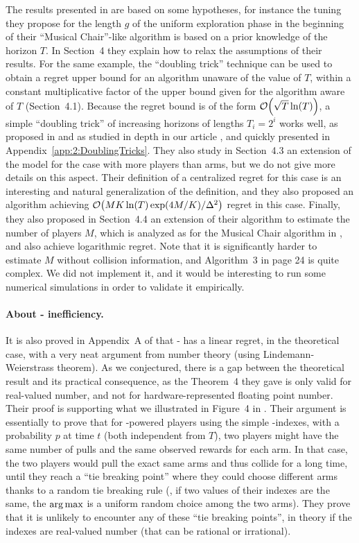 The results presented in \cite{LugosiMehrabian18} are based on some hypotheses, for instance the tuning they propose for the length $g$ of the uniform exploration phase in the beginning of their ``Musical Chair''-like algorithm is based on a prior knowledge of the horizon $T$.
In Section~4 they explain how to relax the assumptions of their results.
For the same example, the ``doubling trick'' technique can be used to obtain a regret upper bound for an algorithm unaware of the value of $T$, within a constant multiplicative factor of the upper bound given for the algorithm aware of $T$ (Section~4.1). Because the regret bound is of the form $\mathop{}\mathopen{}\mathcal{O}\mathopen{}\left(\sqrt{T} \ln(T)\right)$, a simple ``doubling trick'' of increasing horizons of lengths $T_i = 2^i$ works well, as proposed in \cite{CesaLugosi06} and as studied in depth in our article \cite{Besson2018DoublingTricks}, and quickly presented in Appendix~\ref{app:2:DoublingTricks}.
%
They also study in Section~4.3 an extension of the model for the case with more players than arms, but we do not give more details on this aspect. Their definition of a centralized regret for this case is an interesting and natural generalization of the definition, and they also proposed an algorithm achieving $\mathop{}\mathopen{}\mathcal{O}\mathopen{}\left(M K \ln(T) \exp(4M/K) / \Delta^2\right)$ regret in this case.
Finally, they also proposed in Section~4.4 an extension of their algorithm to estimate the number of players $M$, which is analyzed as for the Musical Chair algorithm in \cite{Rosenski16}, and also achieve logarithmic regret.
Note that it is significantly harder to estimate $M$ without collision information, and Algorithm~3 in page 24 is quite complex.
We did not implement it, and it would be interesting to run some numerical simulations in order to validate it empirically.


\paragraph{About \Selfish-\UCB{} inefficiency.}
%
It is also proved in Appendix~A of \cite{BoursierPerchet18} that \Selfish-\UCB{} has a linear regret, in the theoretical case, with a very neat argument from number theory (using Lindemann-Weierstrass theorem). As we conjectured, there is a gap between the theoretical result and its practical consequence, as the Theorem~4 they gave is only valid for real-valued number, and not for hardware-represented floating point number.
Their proof is supporting what we illustrated in Figure~4 in \cite{Besson2018ALT}.
Their argument is essentially to prove that for \Selfish-powered players using the simple \UCB-indexes, with a probability $p$ at time $t$ (both independent from $T$), two players might have the same number of pulls and the same observed rewards for each arm. In that case, the two players would pull the exact same arms and thus collide for a long time, until they reach a ``tie breaking point'' where they could choose different arms thanks to a random tie breaking rule (\eg, if two values of their \UCB{} indexes are the same, the $\operatorname*{arg\,max}$ is a uniform random choice among the two arms).
They prove that it is unlikely to encounter any of these ``tie breaking points'', in theory if the \UCB{} indexes are real-valued number (that can be rational or irrational).


